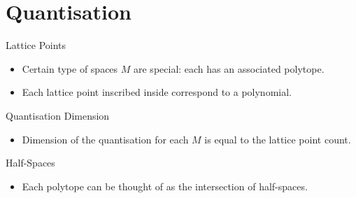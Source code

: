 \section{Quantisation}

\begin{frame}{Lattice Points}

    \begin{itemize}
       \item Certain type of spaces $M$ are special: each has an associated polytope.
       \item Each lattice point inscribed inside correspond to a polynomial.
    \end{itemize}

\end{frame}

\begin{frame}{Quantisation Dimension}

    \begin{itemize}
       \item Dimension of the quantisation for each $M$ is equal to the lattice point count.
    \end{itemize}

\end{frame}

\begin{frame}{Half-Spaces}

    \begin{itemize}
       \item Each polytope can be thought of as the intersection of half-spaces.
    \end{itemize}

\end{frame}